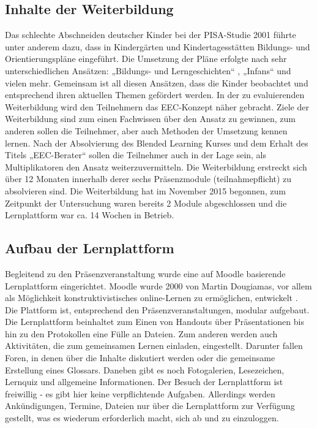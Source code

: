 \documentclass[12pt, bibliography=totoc]{scrartcl}
\begin{document}
\subsection{Inhalte der Weiterbildung}\label{inhalte-der-weiterbildung}

Das schlechte Abschneiden deutscher Kinder bei der PISA-Studie 2001
führte unter anderem dazu, dass in Kindergärten und Kindertagesstätten
Bildungs- und Orientierungspläne eingeführt. Die Umsetzung der Pläne
erfolgte nach sehr unterschiedlichen Ansätzen: „Bildungs- und
Lerngeschichten`` \parencite{leu2007bildungs}, „Infans``
\parencite{laewen2011infans} und vielen mehr. Gemeinsam ist all diesen
Ansätzen, dass die Kinder beobachtet und entsprechend ihren aktuellen
Themen gefördert werden. In der zu evaluierenden Weiterbildung wird den
Teilnehmern das EEC-Konzept \parencite{hebenstreit2007early} näher
gebracht. Ziele der Weiterbildung sind zum einen Fachwissen über den
Ansatz zu gewinnen, zum anderen sollen die Teilnehmer, aber auch
Methoden der Umsetzung kennen lernen. Nach der Absolvierung des Blended
Learning Kurses und dem Erhalt des Titels „EEC-Berater`` sollen die
Teilnehmer auch in der Lage sein, als Multiplikatoren den Ansatz
weiterzuvermitteln. Die Weiterbildung erstreckt sich über 12 Monaten
innerhalb derer sechs Präsenzmodule (teilnahmepflicht) zu absolvieren
sind. Die Weiterbildung hat im November 2015 begonnen, zum Zeitpunkt der
Untersuchung waren bereits 2 Module abgeschlossen und die Lernplattform
war ca. 14 Wochen in Betrieb.

\subsection{Aufbau der Lernplattform}\label{aufbau-der-lernplattform}

Begleitend zu den Präsenzveranstaltung wurde eine auf Moodle basierende
Lernplattform eingerichtet. Moodle wurde 2000 von Martin Dougiamas, vor
allem als Möglichkeit konstruktivistisches online-Lernen zu ermöglichen,
entwickelt \parencite{dougiamas2002interpretive}. Die Plattform ist,
entsprechend den Präsenzveranstaltungen, modular aufgebaut. Die
Lernplattform beinhaltet zum Einen von Handouts über Präsentationen bis
hin zu den Protokollen eine Fülle an Dateien. Zum anderen werden auch
Aktivitäten, die zum gemeinsamen Lernen einladen, eingestellt. Darunter
fallen Foren, in denen über die Inhalte diskutiert werden oder die
gemeinsame Erstellung eines Glossars. Daneben gibt es noch Fotogalerien,
Lesezeichen, Lernquiz und allgemeine Informationen. Der Besuch der
Lernplattform ist freiwillig - es gibt hier keine verpflichtende
Aufgaben. Allerdings werden Ankündigungen, Termine, Dateien nur über die
Lernplattform zur Verfügung gestellt, was es wiederum erforderlich
macht, sich ab und zu einzuloggen.
\end{document}
